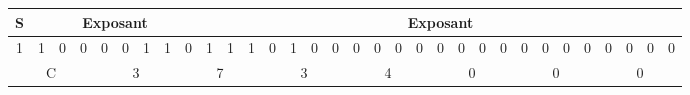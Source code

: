 \documentclass[10pt,fleqn]{article} %
\begin{document}
\footnotesize{
\begin{center}
\begin{tabular}{|c|c|c|c|c|c|c|c|c|c|c|c|c|c|c|c|c|c|c|c|c|c|c|c|c|c|c|c|c|c|c|c|}
\hline
S & \multicolumn{8}{c|}{Exposant} & \multicolumn{23}{c|}{Exposant} \\
\hline
1 & 1 & 0 & 0 & 0 & 0 & 1 & 1 & 0 & 1 & 1 & 1 & 0 & 1 & 0 & 0 & 
0 & 0 & 0 & 0 & 0 & 0 & 0 & 0 & 0 & 0 & 0 & 0 & 0 & 0 & 0 & 0 \\
\hline
\multicolumn{4}{|c|}{C} & \multicolumn{4}{c|}{3} & \multicolumn{4}{c|}{7} & 
\multicolumn{4}{|c|}{3} & \multicolumn{4}{|c|}{4} & \multicolumn{4}{c|}{0} & 
\multicolumn{4}{c|}{0} & \multicolumn{4}{|c|}{0} \\
\hline
\end{tabular}
\end{center}}
\end{document}
